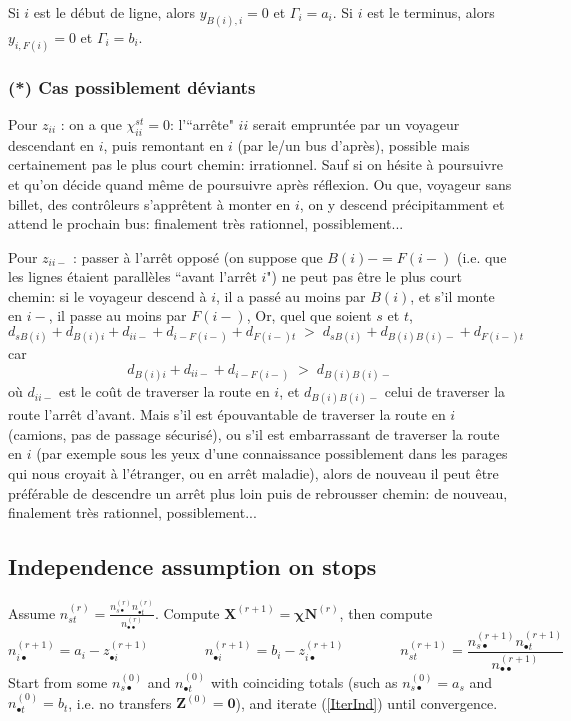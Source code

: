 \documentclass{article}
\theoremstyle{plain}
\begin{document}
Si $i$ est le début de ligne, alors $y_{B(i),i}=0$ et $\Gamma_i=a_i$. Si 
$i$ est le terminus, alors $y_{i,F(i)}=0$ et $\Gamma_i=b_i$.



\subsubsection{(*) Cas possiblement déviants}
\label{casdev}
Pour $z_{ii}$ : on a que $\chi_{ii}^{st}=0$: l'``arrête" $ii$ serait empruntée par  un voyageur descendant en $i$, puis remontant en $i$ (par le/un bus d'après), possible mais certainement pas le plus court chemin: irrationnel. Sauf si on hésite à poursuivre et qu'on décide quand même de poursuivre après réflexion. Ou que, voyageur sans billet, des contrôleurs s'apprêtent à monter en $i$, on y descend précipitamment et attend le prochain bus: finalement très rationnel, possiblement... 

Pour $z_{ii-}$ : passer à l'arrêt opposé (on suppose que $B(i)-=F(i-)$ (i.e. que les lignes étaient parallèles ``avant l'arrêt $i$") ne peut pas être le plus  court chemin: si le voyageur descend à $i$, il a passé au moins par $B(i)$, et s'il monte en $i-$, il passe au moins par $F(i-)$, Or, quel que soient $s$ et $t$, 
\begin{displaymath}
d_{sB(i)}+d_{B(i)i}+d_{ii-}+d_{i-F(i-)}+d_{F(i-)t}\; >\; d_{sB(i)}+d_{B(i)B(i)-}+d_{F(i-)t}
\end{displaymath}
car 
\begin{displaymath}
 d_{B(i)i}+d_{ii-}+d_{i-F(i-)}\; >\;  d_{B(i)B(i)-}
\end{displaymath}
où $d_{ii-}$ est le coût de traverser la route en $i$, et $d_{B(i)B(i)-}$ celui de traverser la route l'arrêt d'avant. Mais s'il est épouvantable de traverser la route en $i$ (camions, pas de passage sécurisé), ou s'il est embarrassant de traverser la route en $i$ (par exemple sous les yeux d'une connaissance possiblement dans les parages qui nous croyait à l'étranger, ou en arrêt maladie), alors de nouveau il peut être préférable de descendre un arrêt plus loin puis de rebrousser chemin: de nouveau,  finalement très rationnel, possiblement... 


\subsection{Independence assumption on stops}
Assume $n_{st}^{(r)}=\frac{n^{(r)}_{s\bullet}n^{(r)}_{\bullet t}}{n^{(r)}_{\bullet\bullet}}$. Compute $\mathbf{X}^{(r+1)}=\bm{\chi}\mathbf{N}^{(r)}$, then compute
\begin{equation}
\label{IterInd}
n_{i\bullet}^{(r+1)}=a_i-z_{\bullet i}^{(r+1)}
\qquad\qquad
n_{\bullet i}^{(r+1)}=b_i-z_{i\bullet}^{(r+1)}
\qquad\qquad
n_{st}^{(r+1)}=\frac{n^{(r+1)}_{s\bullet}n^{(r+1)}_{\bullet t}}{n^{(r+1)}_{\bullet\bullet}}
\end{equation}
Start from some $n^{(0)}_{s\bullet}$ and $n^{(0)}_{\bullet t}$ with coinciding totals (such as $n^{(0)}_{s\bullet}=a_s$ and $n^{(0)}_{\bullet t}=b_t$, i.e. no transfers $\mathbf{Z}^{(0)}=\mathbf{0}$), and iterate (\ref{IterInd}) until convergence.
\end{document}
